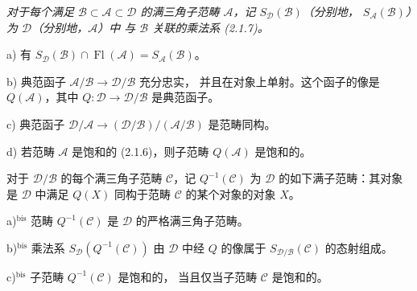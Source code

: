 \clearpage
{}%
\begingroup
\small
\setlength{\parskip}{0pt}%
\setlength{\emergencystretch}{1.5em}%

\begingroup\itshape
{}%
对于每个满足
$\mathcal B\subset\mathcal A\subset\mathcal D$ 的满三角子范畴
$\mathcal A$，记 $S_{\mathcal D}(\mathcal B)$（分别地，
$S_{\mathcal A}(\mathcal B)$）为 $\mathcal D$（分别地，$\mathcal A$）中
与 $\mathcal B$ 关联的乘法系 (2.1.7)。

\par\noindent a) 有
$S_{\mathcal D}(\mathcal B)\cap\operatorname{Fl}(\mathcal A)
=S_{\mathcal A}(\mathcal B)$。

\par\noindent b) 典范函子
$\mathcal A/\mathcal B\longrightarrow\mathcal D/\mathcal B$ 充分忠实，
并且在对象上单射。这个函子的像是 $Q(\mathcal A)$，其中
$Q\colon\mathcal D\longrightarrow\mathcal D/\mathcal B$ 是典范函子。

\par\noindent c) 典范函子
$\mathcal D/\mathcal A\longrightarrow
(\mathcal D/\mathcal B)/(\mathcal A/\mathcal B)$ 是范畴同构。

\par\noindent d) 若范畴 $\mathcal A$ 是饱和的 (2.1.6)，则子范畴
$Q(\mathcal A)$ 是饱和的。

对于 $\mathcal D/\mathcal B$ 的每个满三角子范畴 $\mathcal C$，记
$Q^{-1}(\mathcal C)$ 为 $\mathcal D$ 的如下满子范畴：其对象是
$\mathcal D$ 中满足 $Q(X)$ 同构于范畴 $\mathcal C$ 的某个对象的对象
$X$。

\par\noindent a)$^{\mathrm{bis}}$ 范畴 $Q^{-1}(\mathcal C)$ 是
$\mathcal D$ 的严格满三角子范畴。

\par\noindent b)$^{\mathrm{bis}}$ 乘法系
$S_{\mathcal D}(Q^{-1}(\mathcal C))$ 由 $\mathcal D$ 中经 $Q$ 的像属于
$S_{\mathcal D/\mathcal B}(\mathcal C)$ 的态射组成。

\par\noindent c)$^{\mathrm{bis}}$ 子范畴 $Q^{-1}(\mathcal C)$ 是饱和的，
当且仅当子范畴 $\mathcal C$ 是饱和的。

